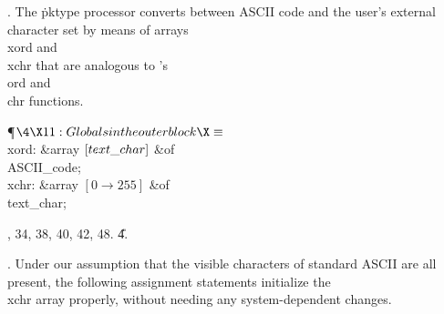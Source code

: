 . The \.{pktype} processor converts between ASCII code and
the user's external character set by means of arrays \\{xord} and \\{xchr}
that are analogous to \PASCAL's \\{ord} and \\{chr} functions.

\Y\P$\4\X11:Globals in the outer block\X\S$\6
\4\\{xord}: \&{array} $[\\{text\_char}]$ \1\&{of}\5
\\{ASCII\_code};\2\6
\4\\{xchr}: \&{array} $[0\to255]$ \1\&{of}\5
\\{text\_char};\2\par
{}, 34, 38, 40, 42, 48.
\U4.\fi

. Under our assumption that the visible characters of standard ASCII are
all present, the following assignment statements initialize the
\\{xchr} array properly, without needing any system-dependent changes.

